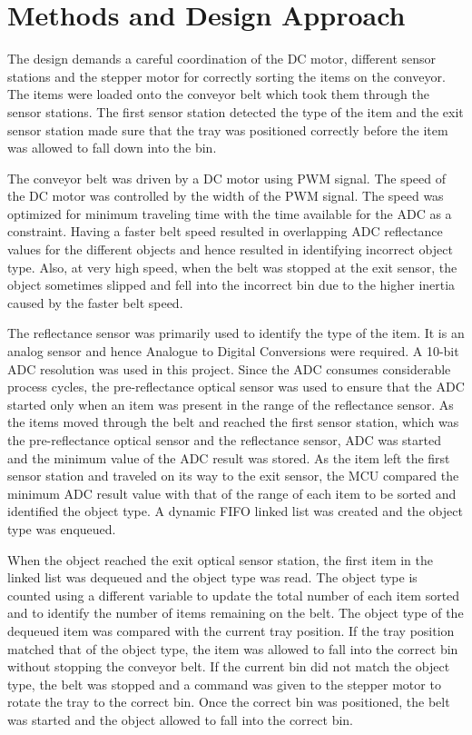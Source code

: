 \section{Methods and Design Approach}\label{sec:intro}
The design demands a careful coordination of the DC motor, different sensor stations and the stepper motor for correctly sorting the items on the conveyor. The items were loaded onto the conveyor belt which took them through the sensor stations. The first sensor station detected the type of the item and the exit sensor station made sure that the tray was positioned correctly before the item was allowed to fall down into the bin.

The conveyor belt was driven by a DC motor using PWM signal. The speed of the DC motor was controlled by the width of the PWM signal. The speed was optimized for minimum traveling time with the time available for the ADC as a constraint. Having a faster belt speed resulted in overlapping ADC reflectance values for the different objects and hence resulted in identifying incorrect object type. Also, at very high speed, when the belt was stopped at the exit sensor, the object sometimes slipped and fell into the incorrect bin due to the higher inertia caused by the faster belt speed.

The reflectance sensor was primarily used to identify the type of the item. It is an analog sensor and hence Analogue to Digital Conversions were required. A 10-bit ADC resolution was used in this project. Since the ADC consumes considerable process cycles, the pre-reflectance optical sensor was used to ensure that the ADC started only when an item was present in the range of the reflectance sensor. As the items moved through the belt and reached the first sensor station, which was the pre-reflectance optical sensor and the reflectance sensor, ADC was started and the minimum value of the ADC result was stored. As the item left the first sensor station and traveled on its way to the exit sensor, the MCU compared the minimum ADC result value with that of the range of each item to be sorted and identified the object type. A dynamic FIFO linked list was created and the object type was enqueued.

When the object reached the exit optical sensor station, the first item in the linked list was dequeued and the object type was read. The object type is counted using a different variable to update the total number of each item sorted and to identify the number of items remaining on the belt. The object type of the dequeued item was compared with the current tray position. If the tray position matched that of the object type, the item was allowed to fall into the correct bin without stopping the conveyor belt. If the current bin did not match the object type, the belt was stopped and a command was given to the stepper motor to rotate the tray to the correct bin. Once the correct bin was positioned, the belt was started and the object allowed to fall into the correct bin.

